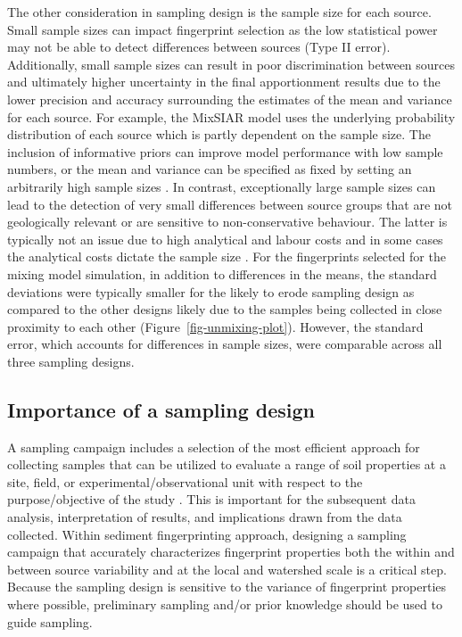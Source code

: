 \documentclass[
  number]{elsarticle}
\begin{document}
The other consideration in sampling design is the sample size for each
source. Small sample sizes can impact fingerprint selection as the low
statistical power may not be able to detect differences between sources
(Type II error). Additionally, small sample sizes can result in poor
discrimination between sources and ultimately higher uncertainty in the
final apportionment results due to the lower precision and accuracy
surrounding the estimates of the mean and variance for each source. For
example, the MixSIAR model uses the underlying probability distribution
of each source which is partly dependent on the sample size. The
inclusion of informative priors can improve model performance with low
sample numbers, or the mean and variance can be specified as fixed by
setting an arbitrarily high sample sizes
\citep{ward2010, parnell2013, stock2018}. In contrast, exceptionally
large sample sizes can lead to the detection of very small differences
between source groups that are not geologically relevant or are
sensitive to non-conservative behaviour. The latter is typically not an
issue due to high analytical and labour costs and in some cases the
analytical costs dictate the sample size \citep[e.g.,][]{kieta2023}. For
the fingerprints selected for the mixing model simulation, in addition
to differences in the means, the standard deviations were typically
smaller for the likely to erode sampling design as compared to the other
designs likely due to the samples being collected in close proximity to
each other (Figure~\ref{fig-unmixing-plot}). However, the standard
error, which accounts for differences in sample sizes, were comparable
across all three sampling designs.

\subsection{Importance of a sampling
design}\label{importance-of-a-sampling-design}

A sampling campaign includes a selection of the most efficient approach
for collecting samples that can be utilized to evaluate a range of soil
properties at a site, field, or experimental/observational unit with
respect to the purpose/objective of the study \citep{pennock2008}. This
is important for the subsequent data analysis, interpretation of
results, and implications drawn from the data collected. Within sediment
fingerprinting approach, designing a sampling campaign that accurately
characterizes fingerprint properties both the within and between source
variability and at the local and watershed scale is a critical step.
Because the sampling design is sensitive to the variance of fingerprint
properties where possible, preliminary sampling and/or prior knowledge
should be used to guide sampling.
\end{document}
